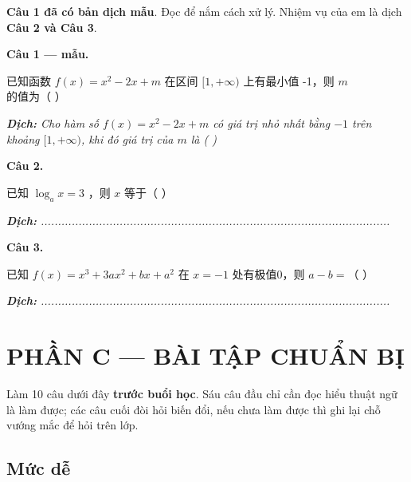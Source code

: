 \documentclass[11pt, a4paper]{article}
\begin{document}
\textbf{Câu 1 đã có bản dịch mẫu}. Đọc để nắm cách xử lý. Nhiệm vụ của em là dịch \textbf{Câu 2 và Câu 3}.

\textbf{Câu 1 — mẫu.}

已知函数 $f(x) = x^2 - 2x + m$ 在区间 $[1, +\infty)$ 上有最小值 -1，则 $m$ 的值为（ ）

\noindent\emph{\textbf{Dịch:} Cho hàm số $f(x) = x^2 - 2x + m$ có giá trị nhỏ nhất bằng $-1$ trên khoảng $[1, +\infty)$, khi đó giá trị của $m$ là ( )}

\textbf{Câu 2.}

已知 $\log_a x = 3$ ，则 $x$ 等于（ ）

\noindent\emph{\textbf{Dịch:} ......................................................................................................}

\textbf{Câu 3.}

已知 $f(x) = x^3 + 3ax^2 + bx + a^2$ 在 $x = -1$ 处有极值0，则 $a - b =$（ ）

\noindent\emph{\textbf{Dịch:} ......................................................................................................}

\section{PHẦN C — BÀI TẬP CHUẨN BỊ}

Làm 10 câu dưới đây \textbf{trước buổi học}. Sáu câu đầu chỉ cần đọc hiểu thuật ngữ là làm được; các câu cuối đòi hỏi biến đổi, nếu chưa làm được thì ghi lại chỗ vướng mắc để hỏi trên lớp.

\subsection{Mức dễ}
\end{document}
